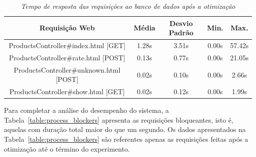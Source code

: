 \begin{table}\centering
\begin{tabular}{c c c c c}
\hline \hline
\textbf{Requisição Web}
& \textbf{Média}
& \textbf{Desvio Padrão}
& \textbf{Min.} 
& \textbf{Max.} \\ \hline
ProductsController\#index.html [GET]    & 1.28s &  3.51s &  0.00s & 57.42s \\
\hline
ProductsController\#rate.html [POST]    & 0.13s &  0.77s &  0.00s & 21.05s \\
\hline
ProductsController\#unknown.html [POST] & 0.02s &  0.10s &  0.00s &  2.66s \\
\hline
ProductsController\#show.html [GET]     & 0.02s &  0.12s &  0.00s &  1.99s \\
\hline
\end{tabular}
\caption{\it Tempo de resposta das requisições ao banco de dados após a otimização \label{table:after_stats}}
\end{table}

Para completar a análise do desempenho do sistema, a Tabela~\ref{table:process_blockers} apresenta as requisições bloqueantes, isto é, aquelas com duração total maior do que um segundo. Os dados apresentados na Tabela~\ref{table:process_blockers} são referentes apenas as requisições feitas após a otimização até o término do experimento.

